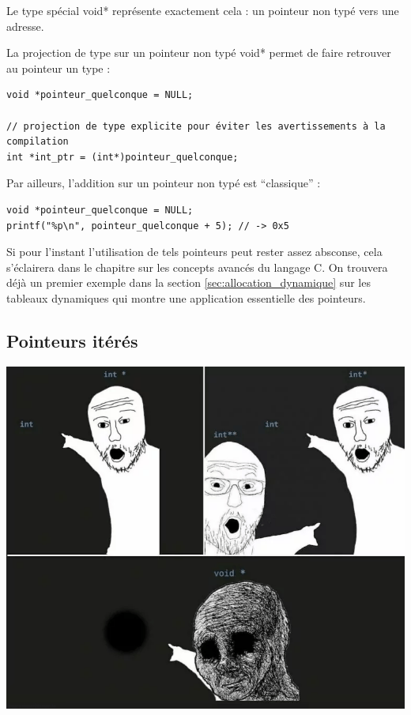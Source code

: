 \documentclass[../../../main.tex]{subfiles}
\begin{document}
Le type spécial \textsf{void*} représente exactement cela : un pointeur non typé vers une adresse.
 
La projection de type sur un pointeur non typé \textsf{void*} permet de faire retrouver au pointeur un type :
\begin{verbatim}
void *pointeur_quelconque = NULL;

// projection de type explicite pour éviter les avertissements à la compilation
int *int_ptr = (int*)pointeur_quelconque; 
\end{verbatim}
Par ailleurs, l'addition sur un pointeur non typé est ``classique'' :
\begin{verbatim}
void *pointeur_quelconque = NULL;
printf("%p\n", pointeur_quelconque + 5); // -> 0x5
\end{verbatim}
Si pour l'instant l'utilisation de tels pointeurs peut rester assez absconse, cela s'éclairera dans le chapitre sur les concepts avancés du langage C. On trouvera déjà un premier exemple dans la section \ref{sec:allocation_dynamique} sur les tableaux dynamiques qui montre une application essentielle des pointeurs.
\subsection{Pointeurs itérés}
\label{sub:pointeurs_it_r_s}
\begin{minipage}{\textwidth}
	\begin{center}
		\includegraphics[width=.75\textwidth]{pointer_meme}
	\end{center}
\end{minipage}
\end{document}
